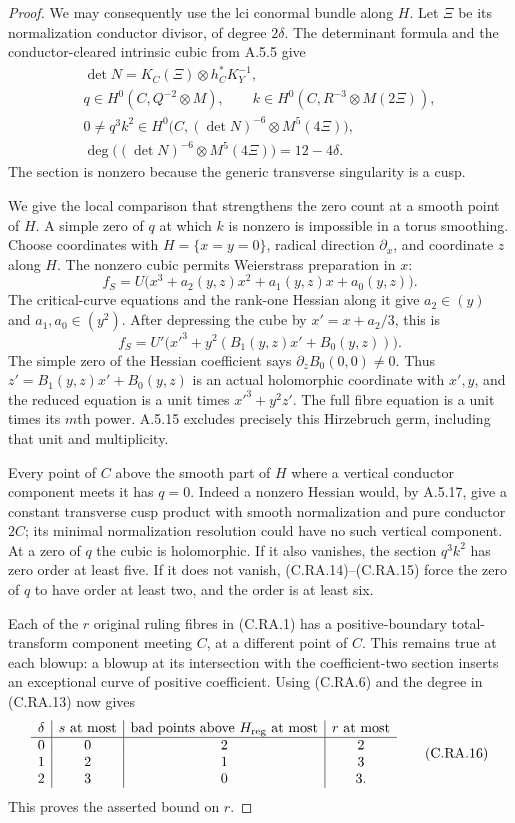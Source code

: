\begin{proof}
We may consequently use the lci conormal bundle along $H$.
Let $\Xi$ be its normalization conductor divisor, of degree
$2\delta$. The determinant formula and the
conductor-cleared intrinsic cubic from A.5.5 give
\[
\begin{gathered}
 \det N=K_C(\Xi)\otimes h_C^*K_Y^{-1},\\
 q\in H^0(C,Q^{-2}\otimes M),\qquad
 k\in H^0(C,R^{-3}\otimes M(2\Xi)),\\
 0\ne q^3k^2\in
 H^0\bigl(C,(\det N)^{-6}\otimes M^5(4\Xi)\bigr),\\
 \deg\bigl((\det N)^{-6}\otimes M^5(4\Xi)\bigr)
                         =12-4\delta .
\end{gathered}                                  \tag{C.RA.13}
\]
The section is nonzero because the generic transverse
singularity is a cusp.

We give the local comparison that strengthens the zero
count at a smooth point of $H$. A simple zero of $q$ at
which $k$ is nonzero is impossible in a torus smoothing.
Choose coordinates with $H=\{x=y=0\}$, radical direction
$\partial_x$, and coordinate $z$ along $H$.
The nonzero cubic permits Weierstrass preparation in $x$:
\[
 f_S=U\bigl(x^3+a_2(y,z)x^2+a_1(y,z)x+a_0(y,z)\bigr).
 \tag{C.RA.14}
\]
The critical-curve equations and the rank-one Hessian
along it give $a_2\in(y)$ and $a_1,a_0\in(y^2)$.
After depressing the cube by $x'=x+a_2/3$, this is
\[
 f_S=U'\bigl(x'^3+y^2(B_1(y,z)x'+B_0(y,z))\bigr).
 \tag{C.RA.15}
\]
The simple zero of the Hessian coefficient says
$\partial_zB_0(0,0)\ne0$. Thus
$z'=B_1(y,z)x'+B_0(y,z)$ is an actual holomorphic
coordinate with $x',y$, and the reduced equation is a
unit times $x'^3+y^2z'$. The full fibre equation is a
unit times its $m$th power. A.5.15 excludes precisely
this Hirzebruch germ, including that unit and multiplicity.

Every point of $C$ above the smooth part of $H$ where a
vertical conductor component meets it has $q=0$.
Indeed a nonzero Hessian would, by A.5.17, give a constant
transverse cusp product with smooth normalization and pure
conductor $2C$; its minimal normalization resolution could
have no such vertical component. At a zero of $q$ the
cubic is holomorphic. If it also vanishes, the section
$q^3k^2$ has zero order at least five. If it does not
vanish, (C.RA.14)--(C.RA.15) force the zero of $q$ to
have order at least two, and the order is at least six.

Each of the $r$ original ruling fibres in (C.RA.1) has
a positive-boundary total-transform component meeting $C$,
at a different point of $C$. This remains true at each
blowup: a blowup at its intersection with the coefficient-two
section inserts an exceptional curve of positive coefficient.
Using (C.RA.6) and the degree in (C.RA.13) now gives
\[
 \begin{array}{c|c|c|c}
 \delta& s\text{ at most}&
 \text{bad points above }H_{\rm reg}\text{ at most}&r\text{ at most}\\ \hline
 0&0&2&2\\
 1&2&1&3\\
 2&3&0&3 .
 \end{array}                                    \tag{C.RA.16}
\]
This proves the asserted bound on $r$.


\end{proof}
